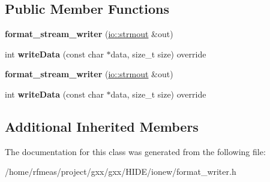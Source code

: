 \subsection*{Public Member Functions}
\begin{DoxyCompactItemize}
\item 
{\bfseries format\+\_\+stream\+\_\+writer} (\hyperlink{classgxx_1_1io_1_1strmout}{io\+::strmout} \&out)\hypertarget{classgxx_1_1io_1_1format__stream__writer_a94e92bf90829e6b205dc5d88eedbccc5}{}\label{classgxx_1_1io_1_1format__stream__writer_a94e92bf90829e6b205dc5d88eedbccc5}

\item 
int {\bfseries write\+Data} (const char $\ast$data, size\+\_\+t size) override\hypertarget{classgxx_1_1io_1_1format__stream__writer_a11c3402a07b72739982a97b82009c28f}{}\label{classgxx_1_1io_1_1format__stream__writer_a11c3402a07b72739982a97b82009c28f}

\item 
{\bfseries format\+\_\+stream\+\_\+writer} (\hyperlink{classgxx_1_1io_1_1strmout}{io\+::strmout} \&out)\hypertarget{classgxx_1_1io_1_1format__stream__writer_a94e92bf90829e6b205dc5d88eedbccc5}{}\label{classgxx_1_1io_1_1format__stream__writer_a94e92bf90829e6b205dc5d88eedbccc5}

\item 
int {\bfseries write\+Data} (const char $\ast$data, size\+\_\+t size) override\hypertarget{classgxx_1_1io_1_1format__stream__writer_a11c3402a07b72739982a97b82009c28f}{}\label{classgxx_1_1io_1_1format__stream__writer_a11c3402a07b72739982a97b82009c28f}

\end{DoxyCompactItemize}
\subsection*{Additional Inherited Members}


The documentation for this class was generated from the following file\+:\begin{DoxyCompactItemize}
\item 
/home/rfmeas/project/gxx/gxx/\+H\+I\+D\+E/ionew/format\+\_\+writer.\+h\end{DoxyCompactItemize}
